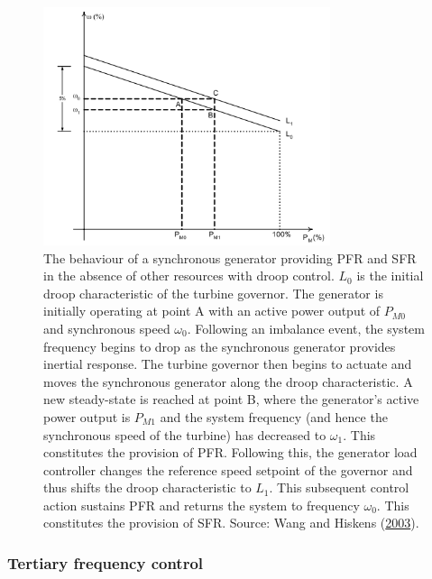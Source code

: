 \documentclass[12pt,a4paper,]{report}
\begin{document}
\begin{figure}
\hypertarget{fig:droop}{%
\centering
\includegraphics[width=0.75\textwidth,height=\textheight]{source/figures/droop.png}
\caption[An example of secondary frequency response sustaining primary
frequency response]{The behaviour of a synchronous generator providing
PFR and SFR in the absence of other resources with droop control.
\(L_0\) is the initial droop characteristic of the turbine governor. The
generator is initially operating at point A with an active power output
of \(P_{M0}\) and synchronous speed \(\omega_0\). Following an imbalance
event, the system frequency begins to drop as the synchronous generator
provides inertial response. The turbine governor then begins to actuate
and moves the synchronous generator along the droop characteristic. A
new steady-state is reached at point B, where the generator's active
power output is \(P_{M1}\) and the system frequency (and hence the
synchronous speed of the turbine) has decreased to \(\omega_1\). This
constitutes the provision of PFR. Following this, the generator load
controller changes the reference speed setpoint of the governor and thus
shifts the droop characteristic to \(L_1\). This subsequent control
action sustains PFR and returns the system to frequency \(\omega_0\).
This constitutes the provision of SFR. Source: Wang and Hiskens
(\protect\hyperlink{ref-wangReviewAGCImplementation2003}{2003}).}\label{fig:droop}
}
\end{figure}

\hypertarget{tertiary-frequency-control}{%
\subsubsection{Tertiary frequency
control}\label{tertiary-frequency-control}}
\end{document}
